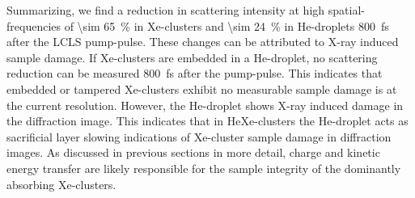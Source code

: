 %
Summarizing, we find a reduction in scattering intensity at high spatial-frequencies of \SI{\sim 65}{\percent} in Xe-clusters and \SI{\sim 24}{\percent} in He-droplets \SI{800}{\femto\second} after the LCLS pump-pulse. These changes can be attributed to X-ray induced sample damage. If Xe-clusters are embedded in a He-droplet, no scattering reduction can be measured \SI{800}{\femto\second} after the pump-pulse. This indicates that embedded or tampered Xe-clusters exhibit no measurable sample damage is at the current resolution. However, the He-droplet shows X-ray induced damage in the diffraction image. This indicates that in HeXe-clusters the He-droplet acts as sacrificial layer slowing indications of Xe-cluster sample damage in diffraction images. As discussed in previous sections in  more detail, charge and kinetic energy transfer \cite{Hau-Riege-2007-PRL,Hoener-2008-JPB} are likely responsible for the sample integrity of the dominantly absorbing Xe-clusters.
%
%
%
%
%
%
